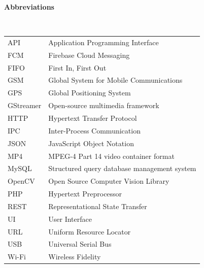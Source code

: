 \vspace*{50pt}
\textbf{\Huge Abbreviations}\\
%
\newenvironment{Abbreviations}
\textbf{\Huge Abbreviations}\\
\begin{tabular}{ll}
API&Application Programming Interface\\
FCM&Firebase Cloud Messaging\\
FIFO&First In, First Out\\
GSM&Global System for Mobile Communications\\
GPS&Global Positioning System\\
GStreamer&Open-source multimedia framework\\
HTTP&Hypertext Transfer Protocol\\
IPC&Inter-Process Communication\\
JSON&JavaScript Object Notation\\
MP4&MPEG-4 Part 14 video container format\\
MySQL&Structured query database management system\\
OpenCV&Open Source Computer Vision Library\\
PHP&Hypertext Preprocessor\\
REST&Representational State Transfer\\
UI&User Interface\\
URL&Uniform Resource Locator\\
USB&Universal Serial Bus\\
Wi-Fi&Wireless Fidelity\\
\end{tabular}


 